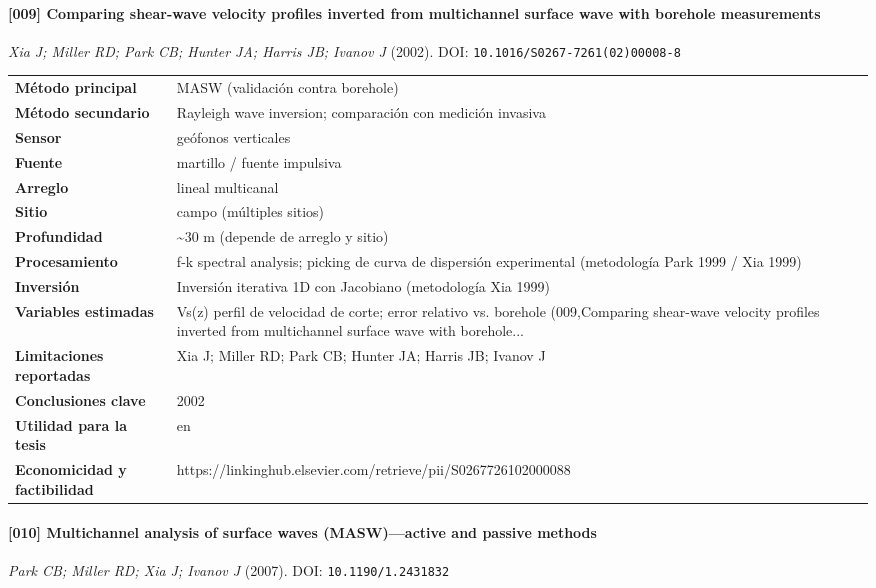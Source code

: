 \paragraph{[009] Comparing shear-wave velocity profiles inverted from multichannel surface wave with borehole measurements} \emph{Xia J; Miller RD; Park CB; Hunter JA; Harris JB; Ivanov J} (2002).
{\scriptsize DOI: \texttt{10.1016/S0267-7261(02)00008-8}}

\begin{center}\scriptsize
\begin{tabularx}{\textwidth}{@{}>{\bfseries}p{3.3cm} X@{}}
\toprule
M\'etodo principal & MASW (validación contra borehole) \\
M\'etodo secundario & Rayleigh wave inversion; comparación con medición invasiva \\
Sensor & geófonos verticales \\
Fuente & martillo / fuente impulsiva \\
Arreglo & lineal multicanal \\
Sitio & campo (múltiples sitios) \\
Profundidad & \textasciitilde{}30 m (depende de arreglo y sitio) \\
Procesamiento & f-k spectral analysis; picking de curva de dispersión experimental (metodología Park 1999 / Xia 1999) \\
Inversi\'on & Inversión iterativa 1D con Jacobiano (metodología Xia 1999) \\
Variables estimadas & Vs(z) perfil de velocidad de corte; error relativo vs. borehole (009,Comparing shear-wave velocity profiles inverted from multichannel surface wave with borehole... \\
Limitaciones reportadas & Xia J; Miller RD; Park CB; Hunter JA; Harris JB; Ivanov J \\
Conclusiones clave & 2002 \\
Utilidad para la tesis & en \\
Economicidad y factibilidad & https://linkinghub.elsevier.com/retrieve/pii/S0267726102000088 \\
\bottomrule
\end{tabularx}
\end{center}

\paragraph{[010] Multichannel analysis of surface waves (MASW)---active and passive methods} \emph{Park CB; Miller RD; Xia J; Ivanov J} (2007).
{\scriptsize DOI: \texttt{10.1190/1.2431832}}

